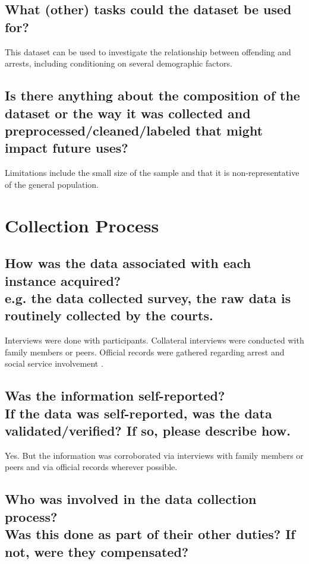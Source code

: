 \documentclass[letterpaper, 10 pt, conference]{ieeeconf}  %
\newcommand{\subtitle}[1]{{\\ \small \normalfont \color{purple} #1}}
\begin{document}
\subsection{What (other) tasks could the dataset be used for?}

This dataset can be used to investigate the relationship between offending and arrests, including conditioning on several demographic factors.

\subsection{Is there anything about the composition of the dataset or the way it was collected and preprocessed/cleaned/labeled that might impact future uses?}

Limitations include the small size of the sample and that it is non-representative of the general population. 


\section{Collection Process}

\subsection{How was the data associated with each instance acquired? \subtitle {e.g. the data collected survey, the raw data is routinely collected by the courts.}}

Interviews were done with participants. Collateral interviews were conducted with family members
or peers. Official records were gathered regarding arrest and social service involvement \cite{pathways_report}.

\subsection{Was the information self-reported? \subtitle{If the data was self-reported, was the data validated/verified? If so, please describe how.}}

Yes. But the information was corroborated via interviews with family members or peers and via official records wherever possible. 


\subsection{Who was involved in the data collection process? \subtitle{Was this done as part of their other duties? If not, were they compensated?}}
\end{document}
